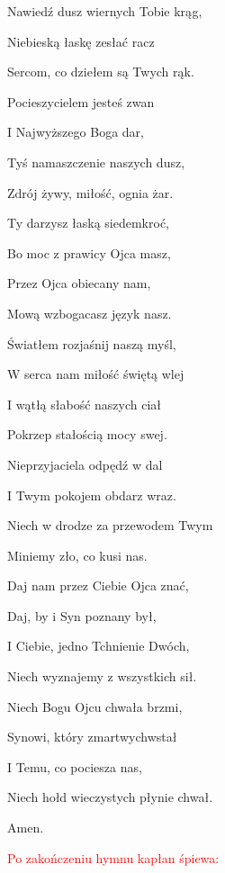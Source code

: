 \begin{Parallel}[v]{0.485\textwidth}{0.485\textwidth}
{Nawiedź dusz wiernych Tobie krąg,

Niebieską łaskę zesłać racz

Sercom, co dziełem są Twych rąk.

\quad Pocieszycielem jesteś zwan

I Najwyższego Boga dar,

Tyś namaszczenie naszych dusz,

Zdrój żywy, miłość, ognia żar.

\quad Ty darzysz łaską siedemkroć,

Bo moc z prawicy Ojca masz,

Przez Ojca obiecany nam,

Mową wzbogacasz język nasz.

\quad Światłem rozjaśnij naszą myśl,

W serca nam miłość świętą wlej

I wątłą słabość naszych ciał

Pokrzep stałością mocy swej.

\quad Nieprzyjaciela odpędź w dal

I Twym pokojem obdarz wraz.

Niech w drodze za przewodem Twym

Miniemy zło, co kusi nas.

\quad Daj nam przez Ciebie Ojca znać,

Daj, by i Syn poznany był,

I Ciebie, jedno Tchnienie Dwóch,

Niech wyznajemy z wszystkich sił.

\quad Niech Bogu Ojcu chwała brzmi,

Synowi, który zmartwychwstał

I Temu, co pociesza nas,

Niech hołd wieczystych płynie chwał. 

Amen.
}
\end{Parallel}

\begin{center}
\textcolor{red}{Po zakończeniu hymnu kapłan śpiewa:}\\[0.2cm]
\end{center}

